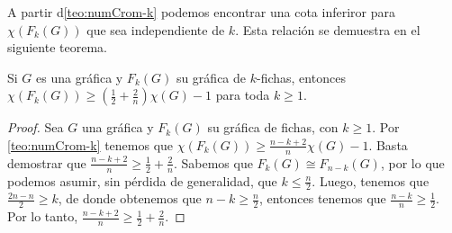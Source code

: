 A partir d\cref{teo:numCrom-k} podemos encontrar una cota inferiror
para $\chi(F_k(G))$ que sea independiente de $k$. Esta relaci\'on se demuestra
en el siguiente teorema.

\begin{teorema}
\label{teo:numCrom indep-k}
    Si $G$ es una gr\'afica y $F_k(G)$ su gr\'afica de $k$-fichas, entonces
    $\chi (F_k(G)) \geq (\frac{1}{2}+ \frac{2}{n})\chi(G) -1 $ para toda $k \geq
    1$.
\end{teorema}
    
\begin{proof}
    Sea $G$ una gr\'afica y $F_k(G)$ su gr\'afica de fichas, con $k \geq 1$. Por
    \cref{teo:numCrom-k} tenemos que $\chi(F_k(G)) \geq \frac{n-k+2}{n} \chi(G)
    -1$. Basta demostrar que $\frac{n-k+2}{n} \geq \frac{1}{2}+\frac{2}{n}$.
    Sabemos que $F_k(G) \cong F_{n-k}(G)$, por lo que podemos asumir, sin
    p\'erdida de generalidad, que $k\leq \frac{n}{2}$. Luego, tenemos que
    $\frac{2n-n}{2}\geq k$, de donde obtenemos que $n-k \geq \frac{n}{2}$,
    entonces tenemos que $\frac{n-k}{n}\geq \frac{1}{2}$. Por lo tanto,
    $\frac{n-k+2}{n} \geq \frac{1}{2}+\frac{2}{n}$.
\end{proof}